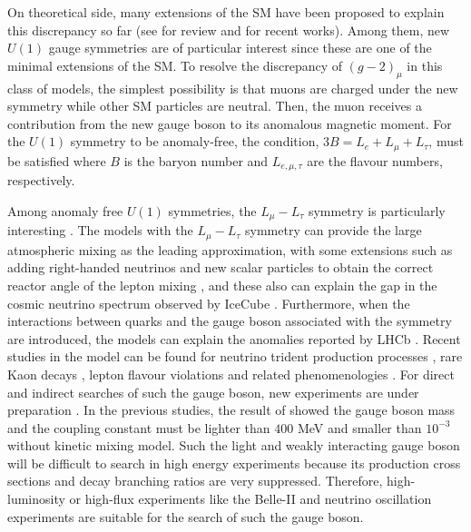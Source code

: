 \documentclass[preprint,amsmath,amssymb,superscriptaddress,nofootinbib]{revtex4}
\begin{document}
On theoretical side, many extensions of the SM have been proposed to explain this discrepancy 
so far (see \cite{Jegerlehner:2009ry, Lindner:2016bgg} for review and \cite{Fayet:2016nyc} for recent works). 
Among them, new $U(1)$ gauge symmetries are of particular interest since these are one of the minimal extensions of the SM. 
To resolve the discrepancy of $(g-2)_\mu$ in this class of models, the simplest possibility is that muons are charged 
under the new symmetry while other SM particles are neutral. 
Then, the muon receives a contribution from the new gauge boson to its anomalous magnetic moment. 
For the $U(1)$ symmetry to be anomaly-free, the condition, $3B = L_e + L_\mu + L_\tau$, must be satisfied where   
$B$ is the baryon number and $L_{e,\mu,\tau}$ are the flavour numbers, respectively. 

Among anomaly free $U(1)$ symmetries, the $L_\mu - L_\tau$ symmetry is 
particularly interesting \cite{Foot:1990mn, Foot:1994vd, He:1991qd}. The models with the $L_\mu - L_\tau$ symmetry 
can provide the large atmospheric mixing as the leading approximation, with some extensions such as adding 
right-handed neutrinos and new scalar particles to obtain the correct 
reactor angle of the lepton mixing \cite{Choubey:2004hn, Ota:2006xr, Heeck:2010pg, Heeck:2011wj, Heeck:2014qea, Biswas:2016yjr, Biswas:2016yan}, and these also can explain the gap in the cosmic neutrino spectrum observed by 
IceCube \cite{Aartsen:2014gkd,  Araki:2014ona, Kamada:2015era, Araki:2015mya}. 
Furthermore, when the interactions between quarks and the gauge boson associated with the symmetry are 
introduced, the models can explain the anomalies reported by 
LHCb \cite{Altmannshofer:2014cfa, Altmannshofer:2015mqa, Altmannshofer:2016jzy}. 
%
Recent studies in the model can be found for neutrino trident production processes \cite{Altmannshofer:2014pba, Magill:2016hgc}, 
rare Kaon decays \cite{Ibe:2016dir}, lepton flavour violations \cite{Altmannshofer:2016brv} and 
related phenomenologies \cite{Harigaya:2013twa, Patra:2016shz, Biswas:2016yan, Heeck:2016xwg, Biswas:2016yjr}. 
For direct and indirect searches of such the gauge boson,  new experiments are under preparation \cite{Gninenko:2014pea, Acciarri:2015uup, Anelli:2015pba}.
%
In the previous studies, the result of \cite{Altmannshofer:2014pba} showed the gauge boson mass and the coupling constant must 
be lighter than $400$ MeV and smaller than $10^{-3}$ without kinetic mixing model. 
Such the light and weakly interacting gauge boson will be difficult to search in high energy experiments because its 
production cross sections and decay branching ratios are very suppressed. 
Therefore, high-luminosity or high-flux experiments like the Belle-II and neutrino oscillation experiments are 
suitable for the search of such the gauge boson. 
\end{document}
